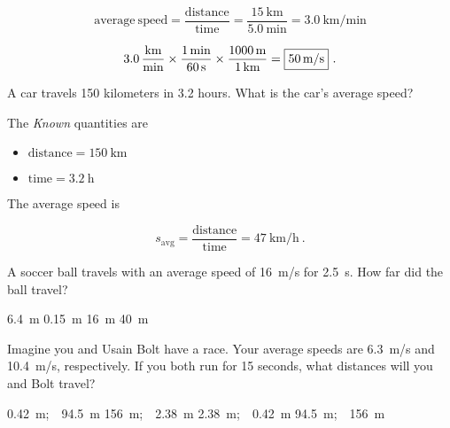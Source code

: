\documentclass[answers]{exam}
\begin{document}
\begin{questions}
\begin{questions}
\begin{solution}
\begin{equation*}
    \mathrm{average\ speed = \frac{distance}{time}} = \frac{\SI{15}{\kilo\meter}}{\SI{5.0}{\minute}} = \SI[per-mode=fraction]{3.0}{\kilo\meter\per\minute}
\end{equation*}

\begin{equation*}
    \SI[per-mode=fraction]{3.0}{\kilo\meter\per\minute} \times \frac{\SI{1}{\minute}}{\SI{60}{\second}} \times \frac{\SI{1000}{\meter}}{\SI{1}{\kilo\meter}} = \framebox{\SI{50}{\meter/\second}}\ .
\end{equation*}
\end{solution}


\question
A car travels 150 kilometers in 3.2 hours. What is the car's average speed?

\begin{solution}
The \textit{Known} quantities are

\begin{itemize}
    \item $\mathrm{distance} = \SI{150}{\km}$
    \item $\mathrm{time} = \SI{3.2}{\hour}$
\end{itemize}

The average speed is

\begin{equation*}
    s_{\mathrm{avg}} = \mathrm{\frac{distance}{time}} = \SI[per-mode=symbol]{47}{\km\per\hour}\ .
\end{equation*}
\end{solution}

\question
A soccer ball travels with an average speed of \SI{16}{m/s} for \SI{2.5}{s}. How far did the ball travel?

\begin{choices}
    \choice \SI{6.4}{m}
    \choice \SI{0.15}{m}
    \choice \SI{16}{m}
    \correctchoice \SI{40}{m}
\end{choices}

\question
Imagine you and Usain Bolt have a race. Your average speeds are \SI{6.3}{m/s} and \SI{10.4}{m/s}, respectively. If you both run for 15 seconds, what distances will you and Bolt travel?

\begin{choices}
    \choice  \SI{0.42}{m};\ \ \SI{94.5}{m}
    \choice  \SI{156}{m};\ \ \SI{2.38}{m}
    \choice  \SI{2.38}{m};\ \ \SI{0.42}{m}
    \correctchoice \SI{94.5}{m};\ \ \SI{156}{m} 
\end{choices}


\end{questions}
\end{questions}
\end{document}
